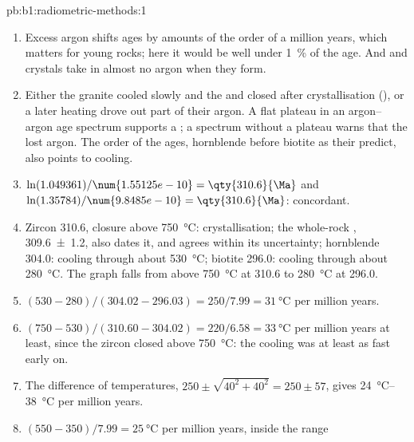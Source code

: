 \begin{solution}{pb:b1:radiometric-methods:1}
\begin{enumerate}
  \item Excess argon shifts ages by amounts of the order of a million years, which
        matters for young rocks; here it would be well under \qty{1}{\percent} of
        the age. And  and  crystals take in almost no argon when they
        form.
  \item Either the granite cooled slowly and the  and  closed after
        crystallisation (), or a later heating drove out part of their
        argon. A flat plateau in an argon--argon age spectrum supports a ; a spectrum without a plateau warns that the  lost argon. The
        order of the ages, hornblende before biotite as their  predict, also points to cooling.
  \item $\ln(1.049361)/\num{1.55125e-10} = \qty{310.6}{\Ma}$ and
        $\ln(1.35784)/\num{9.8485e-10} = \qty{310.6}{\Ma}$: concordant.
  \item Zircon \qty{310.6}{\Ma}, closure above \qty{750}{\celsius}:
        crystallisation; the whole-rock ,
        \qty[uncertainty-mode=separate]{309.6(12)}{\Ma}, also dates
        it, and agrees within its uncertainty; hornblende \qty{304.0}{\Ma}: cooling
        through about \qty{530}{\celsius}; biotite \qty{296.0}{\Ma}: cooling
        through about \qty{280}{\celsius}. The graph falls from above
        \qty{750}{\celsius} at \qty{310.6}{\Ma} to \qty{280}{\celsius} at
        \qty{296.0}{\Ma}.
  \item $(530 - 280)/(304.02 - 296.03) = 250/7.99 = \qty{31}{\celsius}$ per
        million years.
  \item $(750 - 530)/(310.60 - 304.02) = 220/6.58 = \qty{33}{\celsius}$ per
        million years at least, since the zircon closed above
        \qty{750}{\celsius}: the cooling was at least as fast early on.
  \item The difference of temperatures, $250 \pm \sqrt{40^2 + 40^2} = 250 \pm
        57$, gives \qtyrange{24}{38}{\celsius} per million years.
  \item $(550 - 350)/7.99 = \qty{25}{\celsius}$ per million years, inside the range

\end{enumerate}
\end{solution}
